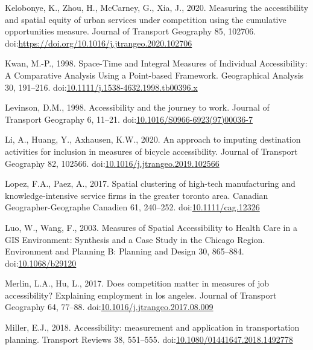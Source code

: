 \documentclass[]{elsarticle} %
\newlength{\cslhangindent}
\newlength{\cslentryspacingunit} %
\newenvironment{CSLReferences}[2] %
 {%
  \setlength{\parindent}{0pt}
  \ifodd #1
  \let\oldpar\par
  \def\par{\hangindent=\cslhangindent\oldpar}
  \fi
  \setlength{\parskip}{#2\cslentryspacingunit}
 }%
 {}
\begin{document}
\begin{CSLReferences}{1}{0}
\leavevmode{}%
Kelobonye, K., Zhou, H., McCarney, G., Xia, J., 2020. Measuring the
accessibility and spatial equity of urban services under competition
using the cumulative opportunities measure. Journal of Transport
Geography 85, 102706.
doi:\url{https://doi.org/10.1016/j.jtrangeo.2020.102706}

\leavevmode{}%
Kwan, M.-P., 1998. Space-{Time} and {Integral} {Measures} of
{Individual} {Accessibility}: {A} {Comparative} {Analysis} {Using} a
{Point}-based {Framework}. Geographical Analysis 30, 191--216.
doi:\href{https://doi.org/10.1111/j.1538-4632.1998.tb00396.x}{10.1111/j.1538-4632.1998.tb00396.x}

\leavevmode{}%
Levinson, D.M., 1998. Accessibility and the journey to work. Journal of
Transport Geography 6, 11--21.
doi:\href{https://doi.org/10.1016/S0966-6923(97)00036-7}{10.1016/S0966-6923(97)00036-7}

\leavevmode{}%
Li, A., Huang, Y., Axhausen, K.W., 2020. An approach to imputing
destination activities for inclusion in measures of bicycle
accessibility. Journal of Transport Geography 82, 102566.
doi:\href{https://doi.org/10.1016/j.jtrangeo.2019.102566}{10.1016/j.jtrangeo.2019.102566}

\leavevmode{}%
Lopez, F.A., Paez, A., 2017. Spatial clustering of high-tech
manufacturing and knowledge-intensive service firms in the greater
toronto area. Canadian Geographer-Geographe Canadien 61, 240--252.
doi:\href{https://doi.org/10.1111/cag.12326}{10.1111/cag.12326}

\leavevmode{}%
Luo, W., Wang, F., 2003. Measures of Spatial Accessibility to Health
Care in a GIS Environment: Synthesis and a Case Study in the Chicago
Region. Environment and Planning B: Planning and Design 30, 865--884.
doi:\href{https://doi.org/10.1068/b29120}{10.1068/b29120}

\leavevmode{}%
Merlin, L.A., Hu, L., 2017. Does competition matter in measures of job
accessibility? Explaining employment in los angeles. Journal of
Transport Geography 64, 77--88.
doi:\href{https://doi.org/10.1016/j.jtrangeo.2017.08.009}{10.1016/j.jtrangeo.2017.08.009}

\leavevmode{}%
Miller, E.J., 2018. Accessibility: measurement and application in
transportation planning. Transport Reviews 38, 551--555.
doi:\href{https://doi.org/10.1080/01441647.2018.1492778}{10.1080/01441647.2018.1492778}


\end{CSLReferences}
\end{document}
